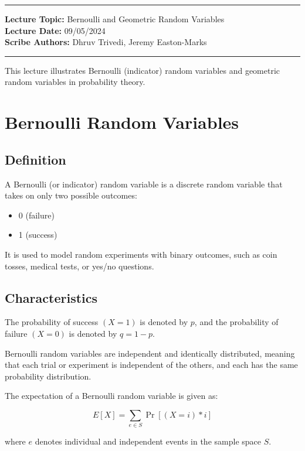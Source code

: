 \hrule
\vspace{0.1in}
\noindent
\textbf{Lecture Topic: } Bernoulli and Geometric Random Variables\\
\textbf{Lecture Date: } 09/05/2024 \\
\textbf{Scribe Authors: }Dhruv Trivedi, Jeremy Easton-Marks
\vspace{0.1in}
\hrule
\vspace{0.1in}

This lecture illustrates Bernoulli (indicator) random variables and geometric random variables in probability theory.

\section*{Bernoulli Random Variables}
    \subsection*{Definition}
        A Bernoulli (or indicator) random variable is a discrete random variable that takes on only two possible outcomes:

        \begin{itemize}
            \item 0 (failure)
            \item 1 (success)
        \end{itemize}

        It is used to model random experiments with binary outcomes, such as coin tosses, medical tests, or yes/no questions.

    \subsection*{Characteristics}
        The probability of success \((X = 1)\) is denoted by \(p\), and the probability of failure \((X = 0)\) is denoted by \(q = 1 - p\).

        Bernoulli random variables are independent and identically distributed, meaning that each trial or experiment is independent of the others, and each has the same probability distribution.

        The expectation of a Bernoulli random variable is given as:

        \[
            E[X] = \sum_{e \in S} \Pr[(X = i) * i]
        \]

        where \(e\) denotes individual and independent events in the sample space \(S\).

